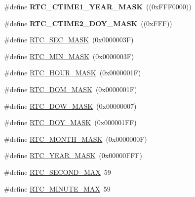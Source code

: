 \begin{DoxyCompactItemize}
\item 
\hypertarget{group___r_t_c___private___macros_gae56e613fe29951a7adaa30e1a3cad8b4}{\#define {\bfseries \-R\-T\-C\-\_\-\-C\-T\-I\-M\-E1\-\_\-\-Y\-E\-A\-R\-\_\-\-M\-A\-S\-K}~((0x\-F\-F\-F0000))}\label{group___r_t_c___private___macros_gae56e613fe29951a7adaa30e1a3cad8b4}

\item 
\hypertarget{group___r_t_c___private___macros_gaef423e0d45dc1e2a201d44f8abb1253a}{\#define {\bfseries \-R\-T\-C\-\_\-\-C\-T\-I\-M\-E2\-\_\-\-D\-O\-Y\-\_\-\-M\-A\-S\-K}~((0x\-F\-F\-F))}\label{group___r_t_c___private___macros_gaef423e0d45dc1e2a201d44f8abb1253a}

\item 
\#define \hyperlink{group___r_t_c___private___macros_gabc478af38e7fa3018d8449f22c51d10e}{\-R\-T\-C\-\_\-\-S\-E\-C\-\_\-\-M\-A\-S\-K}~(0x0000003\-F)
\item 
\#define \hyperlink{group___r_t_c___private___macros_ga9f3224adad8ed73109ee0309c3580998}{\-R\-T\-C\-\_\-\-M\-I\-N\-\_\-\-M\-A\-S\-K}~(0x0000003\-F)
\item 
\#define \hyperlink{group___r_t_c___private___macros_ga3c6fd786e3cb5f56b71474fc2d26a8a4}{\-R\-T\-C\-\_\-\-H\-O\-U\-R\-\_\-\-M\-A\-S\-K}~(0x0000001\-F)
\item 
\#define \hyperlink{group___r_t_c___private___macros_ga7c4ea655a8ccf43870c672c1058a133e}{\-R\-T\-C\-\_\-\-D\-O\-M\-\_\-\-M\-A\-S\-K}~(0x0000001\-F)
\item 
\#define \hyperlink{group___r_t_c___private___macros_ga6564edf565a643214a54ffac364c69ca}{\-R\-T\-C\-\_\-\-D\-O\-W\-\_\-\-M\-A\-S\-K}~(0x00000007)
\item 
\#define \hyperlink{group___r_t_c___private___macros_ga7c8c3332f827ea092523b75ef953bd8b}{\-R\-T\-C\-\_\-\-D\-O\-Y\-\_\-\-M\-A\-S\-K}~(0x000001\-F\-F)
\item 
\#define \hyperlink{group___r_t_c___private___macros_ga491df15fba29dd3237f7bd59a9338050}{\-R\-T\-C\-\_\-\-M\-O\-N\-T\-H\-\_\-\-M\-A\-S\-K}~(0x0000000\-F)
\item 
\#define \hyperlink{group___r_t_c___private___macros_ga35a455a48ccdb557b824e87701449c76}{\-R\-T\-C\-\_\-\-Y\-E\-A\-R\-\_\-\-M\-A\-S\-K}~(0x00000\-F\-F\-F)
\item 
\#define \hyperlink{group___r_t_c___private___macros_ga60bbeee3abbb647a0daa7c2130965646}{\-R\-T\-C\-\_\-\-S\-E\-C\-O\-N\-D\-\_\-\-M\-A\-X}~59
\item 
\#define \hyperlink{group___r_t_c___private___macros_gab55b557eeb5c66e94a2fda3638e3b7ee}{\-R\-T\-C\-\_\-\-M\-I\-N\-U\-T\-E\-\_\-\-M\-A\-X}~59

\end{DoxyCompactItemize}
